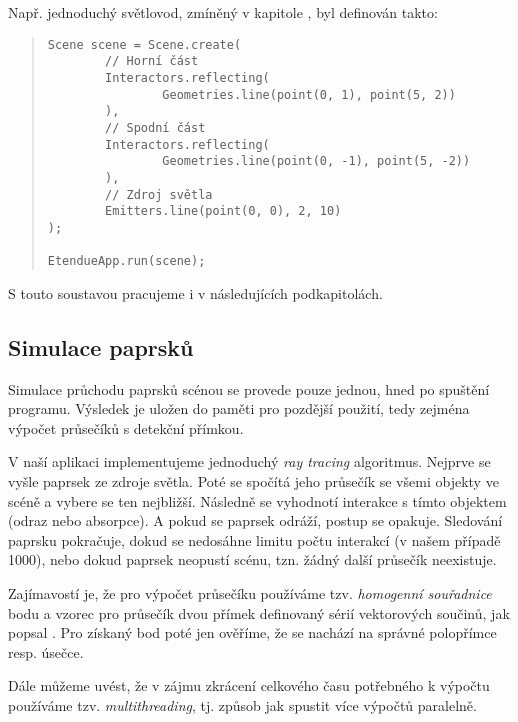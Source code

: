 Např. jednoduchý světlovod, zmíněný v kapitole , byl definován takto:

\begin{minipage}{\textwidth}\begin{quote}\begin{lstlisting}
Scene scene = Scene.create(
        // Horní část
        Interactors.reflecting(
                Geometries.line(point(0, 1), point(5, 2))
        ),
        // Spodní část
        Interactors.reflecting(
                Geometries.line(point(0, -1), point(5, -2))
        ),
        // Zdroj světla
        Emitters.line(point(0, 0), 2, 10)
);

EtendueApp.run(scene);
\end{lstlisting}\end{quote}\end{minipage}

S touto soustavou pracujeme i v následujících podkapitolách.


\subsection{Simulace paprsků}
\label{sub:architekturaaplikace_simulacepaprsku}

Simulace průchodu paprsků scénou se provede pouze jednou, hned po spuštění programu. Výsledek je uložen do paměti pro pozdější použití, tedy zejména výpočet průsečíků s detekční přímkou.

V naší aplikaci implementujeme jednoduchý \emph{ray tracing} algoritmus. Nejprve se vyšle paprsek ze zdroje světla. Poté se spočítá jeho průsečík se všemi objekty ve scéně a vybere se ten nejbližší. Následně se vyhodnotí interakce s tímto objektem (odraz nebo absorpce). A pokud se paprsek odráží, postup se opakuje. Sledování paprsku pokračuje, dokud se nedosáhne limitu počtu interakcí (v našem případě 1000), nebo dokud paprsek neopustí scénu, tzn. žádný další průsečík neexistuje.

Zajímavostí je, že pro výpočet průsečíku používáme tzv. \emph{homogenní souřadnice} bodu a vzorec pro průsečík dvou přímek definovaný sérií vektorových součinů, jak popsal \textcite{skala2008intersection}. Pro získaný bod poté jen ověříme, že se nachází na správné polopřímce resp. úsečce.

Dále můžeme uvést, že v zájmu zkrácení celkového času potřebného k výpočtu používáme tzv. \emph{multithreading}, tj. způsob jak spustit více výpočtů paralelně.


